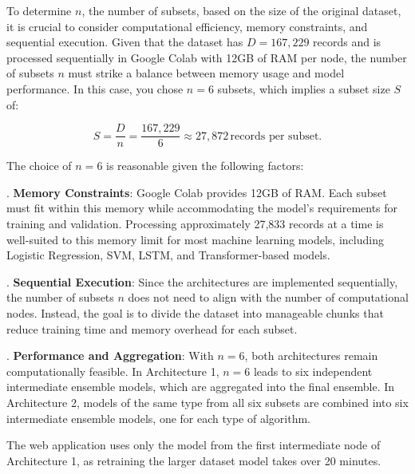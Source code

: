 \pagebreak

\noindent
To determine \( n \), the number of subsets, based on the size of the original dataset, it is crucial to consider computational efficiency, memory constraints, and sequential execution. Given that the dataset has \( D = 167,229 \) records and is processed sequentially in Google Colab with 12GB of RAM per node, the number of subsets \( n \) must strike a balance between memory usage and model performance. In this case, you chose \( n = 6 \) subsets, which implies a subset size \( S \) of:

\[
S = \frac{D}{n} = \frac{167,229}{6} \approx 27,872 \, \text{records per subset}.
\]

\vspace{1em}

\noindent
The choice of \( n = 6 \) is reasonable given the following factors:

\vspace{1em}

. \textbf{Memory Constraints}: Google Colab provides 12GB of RAM. Each subset must fit within this memory while accommodating the model's requirements for training and validation. Processing approximately 27,833 records at a time is well-suited to this memory limit for most machine learning models, including Logistic Regression, SVM, LSTM, and Transformer-based models.

. \textbf{Sequential Execution}: Since the architectures are implemented sequentially, the number of subsets \( n \) does not need to align with the number of computational nodes. Instead, the goal is to divide the dataset into manageable chunks that reduce training time and memory overhead for each subset.

. \textbf{Performance and Aggregation}: With \( n = 6 \), both architectures remain computationally feasible. In Architecture 1, \( n = 6 \) leads to six independent intermediate ensemble models, which are aggregated into the final ensemble. In Architecture 2, models of the same type from all six subsets are combined into six intermediate ensemble models, one for each type of algorithm.

\vspace{1em}

\noindent
The web application uses only the model from the first intermediate node of Architecture 1, as retraining the larger dataset model takes over 20 minutes.


